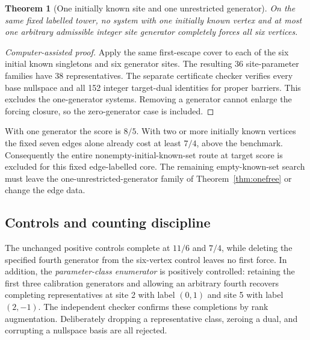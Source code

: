 \documentclass[11pt,letterpaper]{article}
\newtheorem{theorem}{Theorem}[section]
\theoremstyle{definition}
\theoremstyle{remark}\newtheorem{remark}[theorem]{Remark}
\begin{document}
\begin{theorem}[One initially known site and one unrestricted generator]\label{thm:singleton}
On the same fixed labelled tower, no system with one initially known vertex and at most one arbitrary admissible integer site generator completely forces all six vertices.
\end{theorem}
\begin{proof}[Computer-assisted proof]
Apply the same first-escape cover to each of the six initial known singletons and six generator sites. The resulting 36 site-parameter families have 38 representatives. The separate certificate checker verifies every base nullspace and all 152 integer target-dual identities for proper barriers. This excludes the one-generator systems. Removing a generator cannot enlarge the forcing closure, so the zero-generator case is included.
\end{proof}
With one generator the score is $8/5$. With two or more initially known vertices the fixed seven edges alone already cost at least $7/4$, above the benchmark. Consequently the entire nonempty-initial-known-set route at target score is excluded for this fixed edge-labelled core. The remaining empty-known-set search must leave the one-unrestricted-generator family of Theorem~\ref{thm:onefree} or change the edge data.

\subsection{Controls and counting discipline}
The unchanged positive controls complete at $11/6$ and $7/4$, while deleting the specified fourth generator from the six-vertex control leaves no first force. In addition, the \emph{parameter-class enumerator} is positively controlled: retaining the first three calibration generators and allowing an arbitrary fourth recovers completing representatives at site 2 with label $(0,1)$ and site 5 with label $(2,-1)$. The independent checker confirms these completions by rank augmentation. Deliberately dropping a representative class, zeroing a dual, and corrupting a nullspace basis are all rejected.
\end{document}
